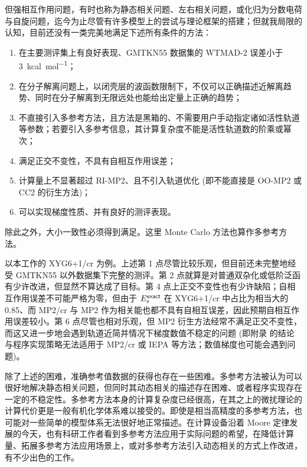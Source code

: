 但强相互作用问题，有时也称为静态相关问题\cite{Cremer-Cremer.MP.2001}、左右相关问题\cite{Handy-Cohen.MP.2001, Cohen-Handy.MP.2001}，或化归为分数电荷与自旋问题\cite{Cohen-Yang.S.2008, Cohen-Yang.JCP.2008, Mori-Sanchez-Yang.PRL.2009}，迄今为止尽管有许多模型上的尝试与理论框架的搭建\cite{Hesselmann-Goerling.PRL.2011, Lan-Yanai.JCP.2013, Mezei-Kallay.JCTC.2015, Zhang-Scheffler.NJP.2016, Goerling-Goerling.PRB.2019, Shee-Head-Gordon.JPCL.2021, Zhang-Xu.JPCL.2021, Kirkpatrick-Cohen.S.2021, Santra-Martin.JPCL.2022}；但就我局限的认知，目前还没有一类完美地满足下述所有条件的方法：
\begin{enumerate}[nosep]
    \item 在主要测评集上有良好表现、GMTKN55 数据集的 WTMAD-2 误差小于 \SI{3}{kcal.mol^{-1}}；
    \item 在分子解离问题上，以闭壳层的波函数限制下，不仅可以正确描述近解离趋势、同时在分子解离到无限远处也能给出定量上正确的趋势；
    \item 不直接引入多参考方法，且方法是黑箱的、不需要用户手动指定诸如活性轨道等参数；若要引入多参考信息，其计算复杂度不能是活性轨道数的阶乘或幂次；
    \item 满足正交不变性，不具有自相互作用误差；
    \item 计算量上不显著超过 RI-MP2、且不引入轨道优化 (即不能直接是 OO-MP2 或 CC2 的衍生方法)；
    \item 可以实现梯度性质、并有良好的测评表现。
\end{enumerate}
除此之外，大小一致性必须得到满足。这里 Monte Carlo 方法也算作多参考方法。

以本工作的 XYG6+1/cr 为例。上述第 1 点尽管比较乐观，但目前还未完整地经受 GMTKN55 以外数据集下完整的测评。第 2 点就算是对普通双杂化或低阶泛函有少许改进，但显然不算达成了目标。第 4 点上正交不变性也有少许缺陷；自相互作用误差不可能严格为零，但由于 $E_{\textsf{x}}^{\textsf{exact}}$ 在 XYG6+1/cr 中占比为相当大的 0.85、而 MP2/cr 与 MP2 作为相关能也都不具有自相互误差，因此预期自相互作用误差较小。第 6 点尽管也相对乐观，但 MP2 衍生方法经常不满足正交不变性，而这又进一步地会遇到轨道近简并情况下梯度数值不稳定的问题 (即附录  的结论与程序实现策略无法适用于 MP2/cr 或 IEPA 等方法；数值梯度也可能会遇到问题)。

除了上述的困难，准确参考值数据的获得也存在一些困难。多参考方法被认为可以很好地解决静态相关问题，但同时其动态相关的描述存在困难、或者程序实现存在一定的不稳定性。多参考方法本身的计算复杂度已经很高，在其之上的微扰理论的计算代价更是一般有机化学体系难以接受的\cite{Finley-Serrano-Andres.CPL.1998, Angeli-Malrieu.JCP.2001, Angeli-Malrieu.CPL.2001, Malmqvist-Gagliardi.JCP.2008, Pulay-Pulay.IJQC.2011}。即使是相当高精度的多参考方法，也可能对一些简单的模型体系无法很好地正常描述\cite{Vancoillie-Veryazov.JCTC.2016}。在计算设备沿着 Moore 定律发展的今天，也有科研工作者看到多参考方法应用于实际问题的希望，在降低计算量、拓展多参考方法应用场景上\cite{Ren-Shuai.WCMS.2022, Li-Chen.PRR.2022, Xiang-Li.JCTC.2024}，或对多参考方法引入动态相关的方式上作改进\cite{Mitra-Gagliardi.JCTC.2023, Feng-Xu.chemRxiv.2023}，有不少出色的工作。

